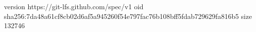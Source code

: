 version https://git-lfs.github.com/spec/v1
oid sha256:7da48a61cf8cb02d6af5a945260f54e797fac76b108bff5fdab729629fa816b5
size 132746

